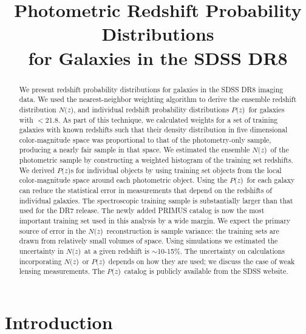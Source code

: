 \documentclass[12pt,preprint]{aastex}
\newcommand{\localbias}{10-15\%}
\newcommand{\rmax}{21.8}
\newcommand{\pofz}{$P(z$)}
\newcommand{\nofz}{$N(z$)}
\begin{document}
\title{Photometric Redshift Probability Distributions \\for Galaxies in the SDSS DR8}



\begin{abstract}


We present redshift probability distributions for galaxies in the SDSS DR8
imaging data.  We used the nearest-neighbor weighting algorithm
\citep{LimaPhotoz08,CunhaPhotoz09} to derive the ensemble redshift distribution
\nofz, and individual redshift probability distributions \pofz\ for galaxies
with \rmag$ < $\rmax.  As part of this technique, we calculated weights for a
set of training galaxies with known redshifts such that their density
distribution in five dimensional color-magnitude space was proportional to that
of the photometry-only sample, producing a nearly fair sample in that space.
We estimated the ensemble \nofz\ of the photometric sample by constructing a
weighted histogram of the training set redshifts.  We derived \pofz s for
individual objects by using training set objects from the local color-magnitude
space around each photometric object.  Using the \pofz\ for each galaxy can
reduce the statistical error in measurements that depend on the redshifts of
individual galaxies. The spectroscopic training sample is substantially larger
than that used for the DR7 release. The newly added PRIMUS catalog is now the
most important training set used in this analysis by a wide margin.  We expect
the primary source of error in the \nofz\ reconstruction is sample variance:
the training sets are drawn from relatively small volumes of space.  Using
simulations we estimated the uncertainty in \nofz\ at a given redshift is
$\sim$\localbias.  The uncertainty on calculations incorporating \nofz\ or
\pofz\ depends on how they are used; we discuss the case of weak lensing
measurements.  The \pofz\ catalog is publicly available from the SDSS website.  

\end{abstract}

\section{Introduction} \label{sec:intro}
\end{document}
